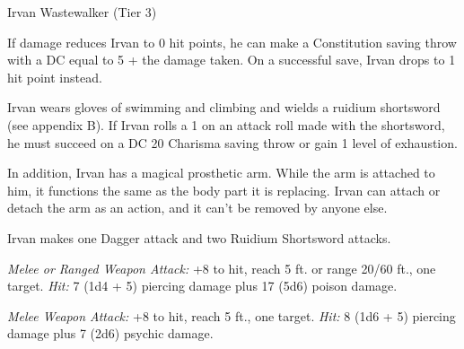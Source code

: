 \documentclass[10pt,a4paper,twoside,bg=none,twocolumn,openany,nodeprecatedcode]{dndbook}
\begin{document}
\begin{DndMonster}[float=t]{Irvan Wastewalker (Tier 3)}
\DndMonsterBasics[
armor-class = {17 (studded leather armor)},
hit-points = {\DndDice{19d8 + 38}},
speed = {40 ft., swim 40 ft. \textit{(see special equipment)}}
]
\DndMonsterAbilityScores[
 str = 10,
 dex = 20,
 con = 14,
 int = 16,
 wis = 16,
 cha = 16
]
\DndMonsterDetails[
saving-throws = {Dex +8, Con +5},
skills = {Acrobatics +8, Deception +9, Stealth +11, Survival +6},
languages = {Common, Goblin, Orc},
challenge = 8,
]
If damage reduces Irvan to 0 hit points, he can make a Constitution saving throw with a DC equal to 5 + the damage taken. On a successful save, Irvan drops to 1 hit point instead.

Irvan wears gloves of swimming and climbing and wields a ruidium shortsword (see appendix B). If Irvan rolls a 1 on an attack roll made with the shortsword, he must succeed on a DC 20 Charisma saving throw or gain 1 level of exhaustion.

In addition, Irvan has a magical prosthetic arm. While the arm is attached to him, it functions the same as the body part it is replacing. Irvan can attach or detach the arm as an action, and it can't be removed by anyone else.

\par
{}
Irvan makes one Dagger attack and two Ruidium Shortsword attacks.

\textsl{Melee or Ranged Weapon Attack:} +8 to hit, reach 5 ft. or range 20/60 ft., one target. \textsl{Hit:} 7 (1d4 + 5) piercing damage plus 17 (5d6) poison damage.

\textsl{Melee Weapon Attack:} +8 to hit, reach 5 ft., one target. \textsl{Hit:} 8 (1d6 + 5) piercing damage plus 7 (2d6) psychic damage.

\end{DndMonster}
\end{document}
